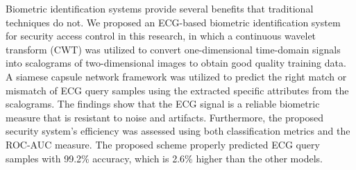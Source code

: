 \documentclass{standalone}
\begin{document}
Biometric identification systems provide several benefits that traditional techniques do not. We proposed an ECG-based biometric identification system for security access control in this research, in which a continuous wavelet transform (CWT) was utilized to convert one-dimensional time-domain signals into scalograms of two-dimensional images to obtain good quality training data. A siamese capsule network framework was utilized to predict the right match or mismatch of ECG query samples using the extracted specific attributes from the scalograms. The findings show that the ECG signal is a reliable biometric measure that is resistant to noise and artifacts. Furthermore, the proposed security system's efficiency was assessed using both classification metrics and the ROC-AUC measure. The proposed scheme properly predicted ECG query samples with 99.2\% accuracy, which is 2.6\% higher than the other models.





\end{document}
